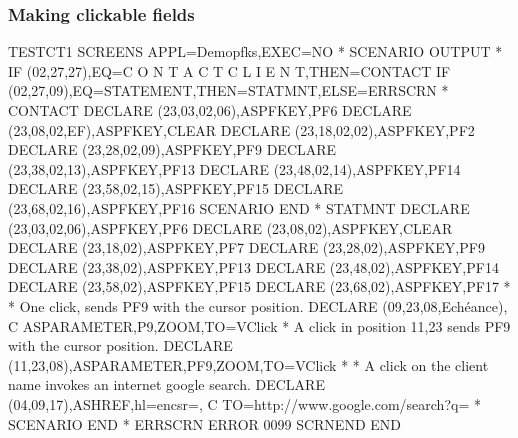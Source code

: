 \documentclass[letterpaper,10pt,english]{sphinxmanual}
\begin{document}


\subsubsection{Making clickable fields}
\label{\detokenize{User_Guide:making-clickable-fields}}
\begin{sphinxVerbatim}[commandchars=\\\{\}]
TESTCT1 SCREENS APPL=Demopfks,EXEC=NO
*
        SCENARIO OUTPUT
*
        IF\PYGZdl{} (02,27,27),EQ=\PYGZsq{}C O N T A C T C L I E N T\PYGZsq{},THEN=CONTACT
        IF\PYGZdl{} (02,27,09),EQ=\PYGZsq{}STATEMENT\PYGZsq{},THEN=STATMNT,ELSE=ERRSCRN
*
CONTACT DECLARE\PYGZdl{} (23,03,02,\PYGZsq{}06\PYGZsq{}),AS\PYGZhy{}PFKEY,\PYGZsq{}PF6\PYGZsq{}
        DECLARE\PYGZdl{} (23,08,02,\PYGZsq{}EF\PYGZsq{}),AS\PYGZhy{}PFKEY,\PYGZsq{}CLEAR\PYGZsq{}
        DECLARE\PYGZdl{} (23,18,02,\PYGZsq{}02\PYGZsq{}),AS\PYGZhy{}PFKEY,\PYGZsq{}PF2\PYGZsq{}
        DECLARE\PYGZdl{} (23,28,02,\PYGZsq{}09\PYGZsq{}),AS\PYGZhy{}PFKEY,\PYGZsq{}PF9\PYGZsq{}
        DECLARE\PYGZdl{} (23,38,02,\PYGZsq{}13\PYGZsq{}),AS\PYGZhy{}PFKEY,\PYGZsq{}PF13\PYGZsq{}
        DECLARE\PYGZdl{} (23,48,02,\PYGZsq{}14\PYGZsq{}),AS\PYGZhy{}PFKEY,\PYGZsq{}PF14\PYGZsq{}
        DECLARE\PYGZdl{} (23,58,02,\PYGZsq{}15\PYGZsq{}),AS\PYGZhy{}PFKEY,\PYGZsq{}PF15\PYGZsq{}
        DECLARE\PYGZdl{} (23,68,02,\PYGZsq{}16\PYGZsq{}),AS\PYGZhy{}PFKEY,\PYGZsq{}PF16\PYGZsq{}
        SCENARIO END
*
STATMNT DECLARE\PYGZdl{} (23,03,02,\PYGZsq{}06\PYGZsq{}),AS\PYGZhy{}PFKEY,\PYGZsq{}PF6\PYGZsq{}
        DECLARE\PYGZdl{} (23,08,02),AS\PYGZhy{}PFKEY,\PYGZsq{}CLEAR\PYGZsq{}
        DECLARE\PYGZdl{} (23,18,02),AS\PYGZhy{}PFKEY,\PYGZsq{}PF7\PYGZsq{}
        DECLARE\PYGZdl{} (23,28,02),AS\PYGZhy{}PFKEY,\PYGZsq{}PF9\PYGZsq{}
        DECLARE\PYGZdl{} (23,38,02),AS\PYGZhy{}PFKEY,\PYGZsq{}PF13\PYGZsq{}
        DECLARE\PYGZdl{} (23,48,02),AS\PYGZhy{}PFKEY,\PYGZsq{}PF14\PYGZsq{}
        DECLARE\PYGZdl{} (23,58,02),AS\PYGZhy{}PFKEY,\PYGZsq{}PF15\PYGZsq{}
        DECLARE\PYGZdl{} (23,68,02),AS\PYGZhy{}PFKEY,\PYGZsq{}PF17\PYGZsq{}
*
* One click, sends PF9 with the cursor position.
        DECLARE\PYGZdl{} (09,23,08,\PYGZsq{}Echéance\PYGZsq{}),                           C
                AS\PYGZhy{}PARAMETER,\PYGZsq{}P9\PYGZsq{},\PYGZsq{}ZOOM\PYGZsq{},TO=VClick
* A click in position 11,23 sends PF9 with the cursor position.
        DECLARE\PYGZdl{} (11,23,08),AS\PYGZhy{}PARAMETER,\PYGZsq{}PF9\PYGZsq{},\PYGZsq{}ZOOM\PYGZsq{},TO=VClick
*
* A click on the client name invokes an internet google search.
        DECLARE\PYGZdl{} (04,09,17),AS\PYGZhy{}HREF,\PYGZsq{}\PYGZam{}\PYGZam{}hl=en\PYGZam{}\PYGZam{}csr=\PYGZsq{},              C
                TO=\PYGZsq{}http://www.google.com/search?q=\PYGZsq{}
*
        SCENARIO END
*
        ERRSCRN ERROR\PYGZdl{} 0099
        SCRNEND
END
\end{sphinxVerbatim}
\end{document}
